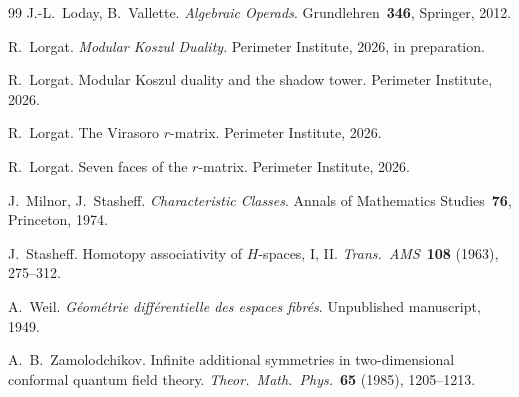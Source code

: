 \documentclass[11pt,reqno]{amsart}
\theoremstyle{definition}
\theoremstyle{remark}
\numberwithin{equation}{section}
\begin{document}
\begin{thebibliography}{99}
J.-L.~Loday, B.~Vallette.
\emph{Algebraic Operads}.
Grundlehren~\textbf{346}, Springer, 2012.

R.~Lorgat.
\emph{Modular Koszul Duality}.
Perimeter Institute, 2026, in preparation.

R.~Lorgat.
Modular Koszul duality and the shadow tower.
Perimeter Institute, 2026.

R.~Lorgat.
The Virasoro $r$-matrix.
Perimeter Institute, 2026.

R.~Lorgat.
Seven faces of the $r$-matrix.
Perimeter Institute, 2026.

J.~Milnor, J.~Stasheff.
\emph{Characteristic Classes}.
Annals of Mathematics Studies~\textbf{76}, Princeton, 1974.

J.~Stasheff.
Homotopy associativity of $H$-spaces, I, II.
\emph{Trans.~AMS}~\textbf{108} (1963), 275--312.

A.~Weil.
\emph{G\'eom\'etrie diff\'erentielle des espaces fibr\'es}.
Unpublished manuscript, 1949.

A.~B.~Zamolodchikov.
Infinite additional symmetries in two-dimensional conformal
quantum field theory.
\emph{Theor.~Math.~Phys.}~\textbf{65} (1985), 1205--1213.

\end{thebibliography}
\end{document}
